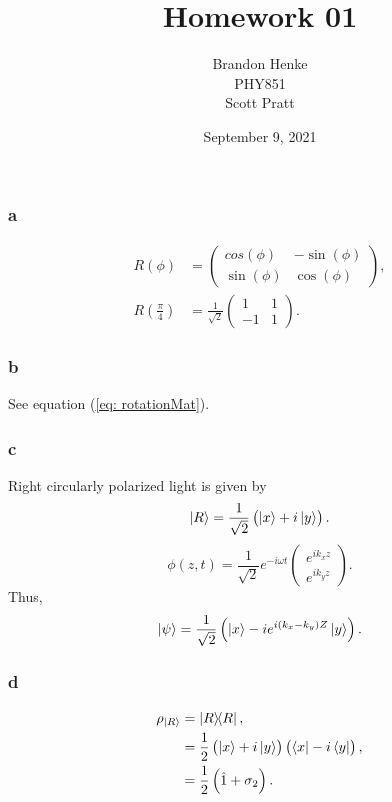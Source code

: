 \documentclass[a4paper,12pt,twoside]{article}
\title{Homework 01}
\author{Brandon Henke\\PHY851\\Scott Pratt}
\date{September 9, 2021}
\begin{document}

\maketitle


\subsection{}%
\subsubsection*{a}
\begin{align}
	R(\phi) &= \begin{pmatrix}
		cos(\phi) & -\sin(\phi)\\
		\sin(\phi) & \cos(\phi)
	\end{pmatrix},
	\label{eq: rotationMat}\\
	R\left(\frac{\pi}{4}\right) &= \frac{1}{\sqrt{2}}\begin{pmatrix}
		1 & 1 \\ -1 & 1
	\end{pmatrix}.
\end{align}
\subsubsection*{b}
See equation (\ref{eq: rotationMat}).
\subsubsection*{c}
Right circularly polarized light is given by
\begin{equation}
	\ket{R} = \frac{1}{\sqrt{2}}\left( \ket{x}+i\ket{y} \right).
\end{equation}
\begin{equation}
	\phi(z,t) = \frac{1}{\sqrt{2}}e^{-i\omega t}\begin{pmatrix}
	e^{i k_x z} \\ e^{i k_y z}
	\end{pmatrix}.
\end{equation}
Thus,
\begin{equation}
	\ket{\psi} = \frac{1}{\sqrt{2}} \left( \ket{x} - i e^{i(k_x-k_y)Z}\ket{y} \right).
\end{equation}
\subsubsection*{d}
\begin{align}
	\rho_{\ket{R}} &= \op{R},\\
	&= \frac{1}{2} \left( \ket{x} + i\ket{y} \right)\left( \bra{x} - i\bra{y} \right),\\
	&= \frac{1}{2} \left( \hat{1} + \sigma_2 \right).
\end{align}
\end{document}
